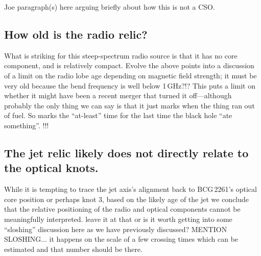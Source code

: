 \documentclass[useAMS,usenatbib]{emulateapj}
\newcommand{\src}{BCG\,2261}
\newcommand{\fixme}[1]{{\color{red} #1 }}
\begin{document}
\fixme{Joe paragraph(s) here arguing briefly about how this is not a CSO.}


\subsection{How old is the radio relic?}
What is striking for this steep-spectrum radio source is that it has no core component, and is relatively compact. 
\fixme{Evolve the above points into a discussion of a limit on the radio lobe age depending on magnetic field strength; it must be very old because the bend frequency is well below 1\,GHz?!? This puts a limit on whether it might have been a recent merger that turned it off---although probably the only thing we can say is that it just marks when the thing ran out of fuel. So marks the ``at-least'' time for the last time the black hole ``ate something''. !!!}


\subsection{The jet relic likely does not directly relate to the optical knots.}
While it is tempting to trace the jet axis's alignment back to \src's optical core position or perhaps knot 3, based on the likely age of the jet we conclude that the relative positioning of the radio and optical components cannot be meaningfully interpreted.
\fixme{leave it at that or is it worth getting into some ``sloshing'' discussion here as we have previously discussed?}
MENTION SLOSHING... it happens on the scale of a few crossing times which can be estimated and that number should be there.
\end{document}
